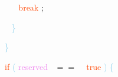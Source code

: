 \documentclass[8, usernames, dvipsnames]{beamer}
\begin{document}
\begin{frame}
 \textcolor{White}{\   }
\textcolor{White}{\   }
\textcolor{White}{\   }
\textcolor{White}{\   }
\textcolor{White}{\   }
\textcolor{OrangeRed}{break}
\textcolor{Sepia}{;}

 \textcolor{White}{\   }
\textcolor{White}{\   }
\textcolor{White}{\   }
\textcolor{White}{\   }
\textcolor{SkyBlue}{\} }

 \textcolor{White}{\   }
\textcolor{White}{\   }
\textcolor{White}{\   }
\textcolor{SkyBlue}{\} }

 \textcolor{White}{\   }
\textcolor{White}{\   }
\textcolor{White}{\   }
\textcolor{OrangeRed}{if}
\textcolor{SkyBlue}{(}
\textcolor{Violet}{reserved}\textcolor{White}{\ }
\textcolor{OliveGreen}{$==$}
\textcolor{White}{\ }
\textcolor{OrangeRed}{true}
\textcolor{SkyBlue}{)}
\textcolor{SkyBlue}{\{ }

 \end{frame}
\end{document}
